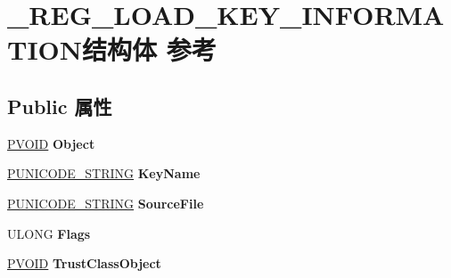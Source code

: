 \hypertarget{struct___r_e_g___l_o_a_d___k_e_y___i_n_f_o_r_m_a_t_i_o_n}{}\section{\+\_\+\+R\+E\+G\+\_\+\+L\+O\+A\+D\+\_\+\+K\+E\+Y\+\_\+\+I\+N\+F\+O\+R\+M\+A\+T\+I\+O\+N结构体 参考}
\label{struct___r_e_g___l_o_a_d___k_e_y___i_n_f_o_r_m_a_t_i_o_n}
\subsection*{Public 属性}
\begin{DoxyCompactItemize}
\item 
\mbox{\label{struct___r_e_g___l_o_a_d___k_e_y___i_n_f_o_r_m_a_t_i_o_n_aa58b6295ee76e4979d874c5d66631cd5}} 
\hyperlink{interfacevoid}{P\+V\+O\+ID} {\bfseries Object}
\item 
\mbox{\label{struct___r_e_g___l_o_a_d___k_e_y___i_n_f_o_r_m_a_t_i_o_n_ae72cadac3eacd74bda7e33e3ef13a5df}} 
\hyperlink{struct___u_n_i_c_o_d_e___s_t_r_i_n_g}{P\+U\+N\+I\+C\+O\+D\+E\+\_\+\+S\+T\+R\+I\+NG} {\bfseries Key\+Name}
\item 
\mbox{\label{struct___r_e_g___l_o_a_d___k_e_y___i_n_f_o_r_m_a_t_i_o_n_af24a0366dce35061e00ac58e8a28794a}} 
\hyperlink{struct___u_n_i_c_o_d_e___s_t_r_i_n_g}{P\+U\+N\+I\+C\+O\+D\+E\+\_\+\+S\+T\+R\+I\+NG} {\bfseries Source\+File}
\item 
\mbox{\label{struct___r_e_g___l_o_a_d___k_e_y___i_n_f_o_r_m_a_t_i_o_n_a9f5f6f28d6b6b81dcb7178ea23cd325c}} 
U\+L\+O\+NG {\bfseries Flags}
\item 
\mbox{\label{struct___r_e_g___l_o_a_d___k_e_y___i_n_f_o_r_m_a_t_i_o_n_ac91d499c9f4c880ff5a11206b65f46a3}} 
\hyperlink{interfacevoid}{P\+V\+O\+ID} {\bfseries Trust\+Class\+Object}
\item 
\mbox{\label{struct___r_e_g___l_o_a_d___k_e_y___i_n_f_o_r_m_a_t_i_o_n_a4cc64c2f3922042a6093c685836d4989}} 

\end{DoxyCompactItemize}

